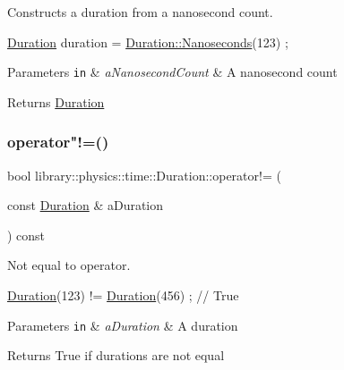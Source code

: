 Constructs a duration from a nanosecond count. 


\begin{DoxyCode}
\hyperlink{classlibrary_1_1physics_1_1time_1_1_duration_a0a70efcf487a841da572afcf00001f64}{Duration} duration = \hyperlink{classlibrary_1_1physics_1_1time_1_1_duration_a6a629b2275337fbadac912cc9364a9f1}{Duration::Nanoseconds}(123) ;
\end{DoxyCode}



\begin{DoxyParams}[1]{Parameters}
\mbox{\tt in}  & {\em a\+Nanosecond\+Count} & A nanosecond count \\
\hline
\end{DoxyParams}
\begin{DoxyReturn}{Returns}
\hyperlink{classlibrary_1_1physics_1_1time_1_1_duration}{Duration} 
\end{DoxyReturn}
\mbox{\label{classlibrary_1_1physics_1_1time_1_1_duration_a620feff807a95ea439fdfdd5cf5490b2}} 
\subsubsection{\texorpdfstring{operator"!=()}{operator!=()}}
{\footnotesize\ttfamily bool library\+::physics\+::time\+::\+Duration\+::operator!= (\begin{DoxyParamCaption}\item[{const \hyperlink{classlibrary_1_1physics_1_1time_1_1_duration}{Duration} \&}]{a\+Duration }\end{DoxyParamCaption}) const}



Not equal to operator. 


\begin{DoxyCode}
\hyperlink{classlibrary_1_1physics_1_1time_1_1_duration_a0a70efcf487a841da572afcf00001f64}{Duration}(123) != \hyperlink{classlibrary_1_1physics_1_1time_1_1_duration_a0a70efcf487a841da572afcf00001f64}{Duration}(456) ; \textcolor{comment}{// True}
\end{DoxyCode}



\begin{DoxyParams}[1]{Parameters}
\mbox{\tt in}  & {\em a\+Duration} & A duration \\
\hline
\end{DoxyParams}
\begin{DoxyReturn}{Returns}
True if durations are not equal 
\end{DoxyReturn}
\mbox{\label{classlibrary_1_1physics_1_1time_1_1_duration_a6aea6dbe11b3199e63ee29a851c3fc16}} 
